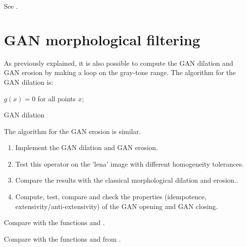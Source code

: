 \begin{pcomment}
\begin{premark}
 See .
\end{premark}
\end{pcomment}



\section{GAN morphological filtering}
As previously explained, it is also possible to compute the GAN dilation and GAN erosion by making a loop on the gray-tone range. The algorithm for the GAN dilation is:

\begin{algorithm}[H]
\SetAlgoLined
{}
\Set $g(x)=0$ for all points $x$;\\
\caption{GAN dilation}
\end{algorithm}
The algorithm for the GAN erosion is similar.
\begin{qbox}
\begin{enumerate}
	\item Implement the GAN dilation and GAN erosion.
	\item Test this operator on the 'lena' image with different homogeneity tolerances.
	\item Compare the results with the classical morphological dilation and erosion..
	\item Compute, test, compare and check the properties (idempotence, ex\-ten\-si\-vi\-ty/anti-extensivity) of the GAN opening and GAN closing.
\end{enumerate}
\end{qbox}

\begin{mcomment}
 \begin{mremark}
  Compare with the functions  and .
 \end{mremark}
\end{mcomment}

\begin{pcomment}
 \begin{premark}
  Compare with the functions  and  from .
 \end{premark}
\end{pcomment}
